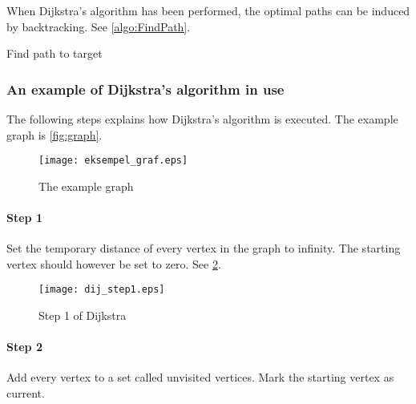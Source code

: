 When Dijkstra's algorithm has been performed, the optimal paths can be induced by backtracking. See \cref{algo:FindPath}.

\begin{algorithm}
  \caption{Find path to target}\label{algo:FindPath}


\end{algorithm}

\subsubsection{An example of Dijkstra's algorithm in use}\label{subss_dij_ex}

The following steps explains how Dijkstra's algorithm is executed. The example graph is \cref{fig:graph}.

  \begin{figure}[ht!]
    \centering
    \texttt{[image: eksempel\_graf.eps]}
    \caption{The example graph}
    \label{fig:dij_example_graph}
  \end{figure}

  \paragraph{Step 1}
Set the temporary distance of every vertex in the graph to infinity. The starting vertex should however be set to zero. See \cref{fig:dij_step1}.

  \begin{figure}[ht!]
    \centering
    \texttt{[image: dij\_step1.eps]}
    \caption{Step 1 of Dijkstra}
    \label{fig:dij_step1}
  \end{figure}

    \paragraph{Step 2}
Add every vertex to a set called unvisited vertices. Mark the starting vertex as current.

